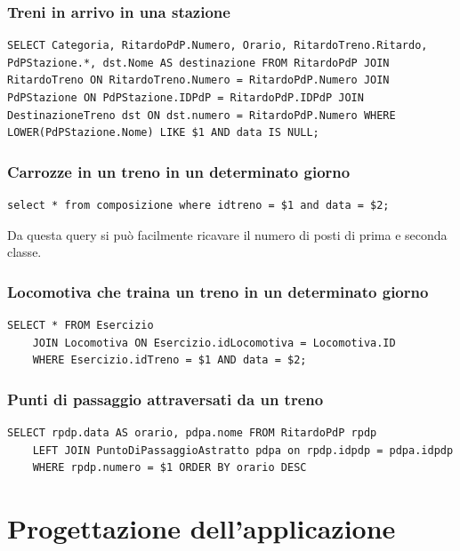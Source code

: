 \documentclass[a4paper,12pt]{report}
\begin{document}
	\subsection{Treni in arrivo in una stazione}
	\begin{verbatim}
SELECT Categoria, RitardoPdP.Numero, Orario, RitardoTreno.Ritardo, PdPStazione.*, dst.Nome AS destinazione FROM RitardoPdP JOIN RitardoTreno ON RitardoTreno.Numero = RitardoPdP.Numero JOIN PdPStazione ON PdPStazione.IDPdP = RitardoPdP.IDPdP JOIN DestinazioneTreno dst ON dst.numero = RitardoPdP.Numero WHERE LOWER(PdPStazione.Nome) LIKE $1 AND data IS NULL;
	\end{verbatim}
	\subsection{Carrozze in un treno in un determinato giorno}
	\begin{verbatim}
select * from composizione where idtreno = $1 and data = $2;
	\end{verbatim}
	\par Da questa query si può facilmente ricavare il numero di posti di prima e seconda classe.
	\subsection{Locomotiva che traina un treno in un determinato giorno}
	\begin{verbatim}
SELECT * FROM Esercizio
    JOIN Locomotiva ON Esercizio.idLocomotiva = Locomotiva.ID
    WHERE Esercizio.idTreno = $1 AND data = $2;
	\end{verbatim}
	\subsection{Punti di passaggio attraversati da un treno}
	\begin{verbatim}
SELECT rpdp.data AS orario, pdpa.nome FROM RitardoPdP rpdp
    LEFT JOIN PuntoDiPassaggioAstratto pdpa on rpdp.idpdp = pdpa.idpdp
    WHERE rpdp.numero = $1 ORDER BY orario DESC
	\end{verbatim}
	\chapter{Progettazione dell'applicazione}
\end{document}
